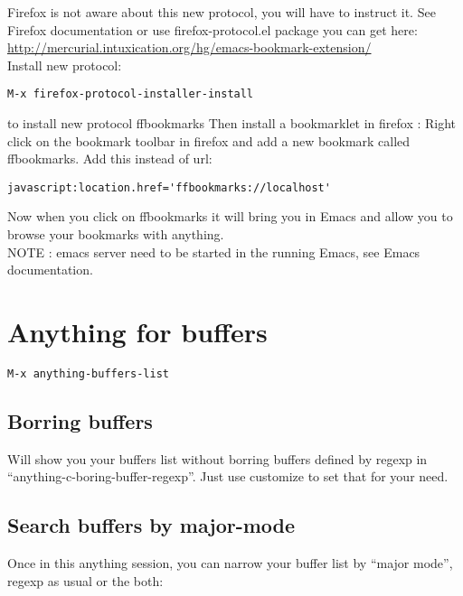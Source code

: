 \documentclass[a4paper,11pt]{article}
\begin{document}
Firefox is not aware about this new protocol, you will have to instruct
it. See Firefox documentation or use firefox-protocol.el package you can get
here: \\
\url{http://mercurial.intuxication.org/hg/emacs-bookmark-extension/} \\
Install new protocol: \\
\begin{verbatim}
M-x firefox-protocol-installer-install
\end{verbatim}
to install new protocol ffbookmarks
Then install a bookmarklet in firefox : Right click on the bookmark
toolbar in firefox and add a new bookmark called ffbookmarks. Add this
instead of url: \\
\begin{verbatim}
javascript:location.href='ffbookmarks://localhost'
\end{verbatim}

Now when you click on ffbookmarks it will bring you in Emacs and allow
you to browse your bookmarks with anything.
\\
NOTE : emacs server need to be started in the running Emacs, see Emacs
documentation.

\section{Anything for buffers}
\label{sec:anything-buffers}

\begin{verbatim}
M-x anything-buffers-list
\end{verbatim}

\subsection{Borring buffers}
\label{sec:borring-buffers}

Will show you your buffers list without borring buffers defined by regexp in
``anything-c-boring-buffer-regexp''.
Just use customize to set that for your need.\\

\subsection{Search buffers by major-mode}
\label{sec:search-buffers-major}


Once in this anything session, you can narrow your buffer list by ``major mode'', regexp as usual or the both:\\
\end{document}
